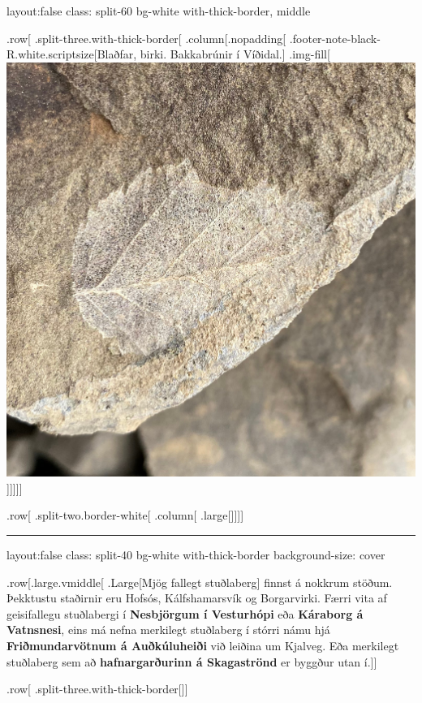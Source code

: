 \documentclass[
]{article}
\begin{document}
layout:false class: split-60 bg-white with-thick-border, middle

.row{[} .split-three.with-thick-border{[} .column{[}.nopadding{[}
.footer-note-black-R.white.scriptsize{[}Blaðfar, birki. Bakkabrúnir í
Víðidal.{]}
.img-fill{[}\includegraphics{myndir/breyttar/bakkabrunir.jpg}{]}{]}{]}{]}{]}

.row{[} .split-two.border-white{[} .column{[} .large{[}{]}{]}{]}{]}

\begin{center}\rule{0.5\linewidth}{0.5pt}\end{center}

layout:false class: split-40 bg-white with-thick-border background-size:
cover

.row{[}.large.vmiddle{[} .Large{[}Mjög fallegt stuðlaberg{]} finnst á
nokkrum stöðum. Þekktustu staðirnir eru Hofsós, Kálfshamarsvík og
Borgarvirki. Færri vita af geisifallegu stuðlabergi í \textbf{Nesbjörgum
í Vesturhópi} eða \textbf{Káraborg á Vatnsnesi}, eins má nefna merkilegt
stuðlaberg í stórri námu hjá \textbf{Friðmundarvötnum á Auðkúluheiði}
við leiðina um Kjalveg. Eða merkilegt stuðlaberg sem að
\textbf{hafnargarðurinn á Skagaströnd} er byggður utan í.{]}{]}

.row{[} .split-three.with-thick-border{[}{]}{]}
\end{document}
